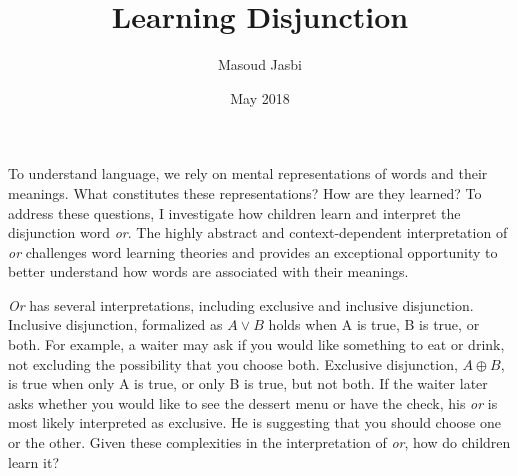 \documentclass[oneside]{report}
\theoremstyle{definition}
\theoremstyle{definition}
\theoremstyle{definition}
\theoremstyle{remark}
\begin{document}
\title{Learning Disjunction}
\author{Masoud Jasbi}
\date{May 2018}


\makeatletter
\def\maxwidth{ %
  \ifdim\Gin@nat@width>\linewidth
    \linewidth
  \else
    \Gin@nat@width
  \fi
}
\makeatother

\renewcommand{\contentsname}{Contents}

\setlength{\parskip}{0pt}


\providecommand{\tightlist}{%
  \setlength{\itemsep}{0pt}\setlength{\parskip}{0pt}}




\beforepreface
{}
To understand language, we rely on mental representations of words and
their meanings. What constitutes these representations? How are they
learned? To address these questions, I investigate how children learn
and interpret the disjunction word \emph{or}. The highly abstract and
context-dependent interpretation of \emph{or} challenges word learning
theories and provides an exceptional opportunity to better understand
how words are associated with their meanings.

\emph{Or} has several interpretations, including exclusive and inclusive
disjunction. Inclusive disjunction, formalized as \(A \vee B\) holds
when A is true, B is true, or both. For example, a waiter may ask if you
would like something to eat or drink, not excluding the possibility that
you choose both. Exclusive disjunction, \(A \oplus B\), is true when
only A is true, or only B is true, but not both. If the waiter later
asks whether you would like to see the dessert menu or have the check,
his \emph{or} is most likely interpreted as exclusive. He is suggesting
that you should choose one or the other. Given these complexities in the
interpretation of \emph{or}, how do children learn it?
\end{document}
